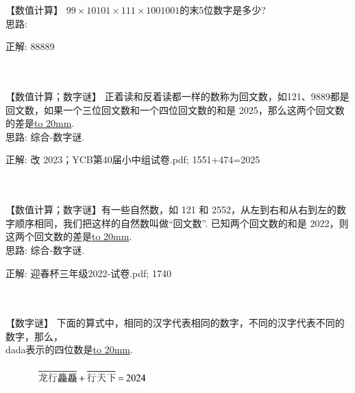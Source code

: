 \item {
    【数值计算】
    $99\times 10101\times 111\times 1001001$的末5位数字是多少?
    \ifshowSolution
        \fangsong{}
        \\
        思路:

        正解: 88889
    \else
        \\ \\ \\
    \fi
}

\item {
    【数值计算；数字谜】
    正着读和反着读都一样的数称为回文数，如121、9889都是回文数，如果一个三位回文数和一个四位回文数的和是 2025，那么这两个回文数的差是\underline{\hbox to 20mm{}}.
    \ifshowSolution
        \fangsong{}
        \\
        思路: 综合-数字谜.

        正解: 改  2023；YCB第40届小中组试卷.pdf; 1551+474=2025
    \else
        \\ \\ \\
    \fi
}

\item {
    【数值计算；数字谜】有一些自然数，如 121 和 2552，从左到右和从右到左的数字顺序相同，我们把这样的自然数叫做``回文数''. 已知两个回文数的和是 2022，则这两个回文数的差是\underline{\hbox to 20mm{}}.
    \ifshowSolution
        \fangsong{}
        \\
        思路: 综合-数字谜.

        正解:  迎春杯三年级2022-试卷.pdf; 1740
    \else
        \\ \\ \\
    \fi
}


\item {
    【数字谜】
    下面的算式中，相同的汉字代表相同的数字，不同的汉字代表不同的数字，那么，\\  dada表示的四位数是\underline{\hbox to 20mm{}}.
    \begin{figure}[H] 
        \centering
        \includegraphics[width=0.4\textwidth]{./pics/Chapter_7/2.png}
    \end{figure}
    \vspace{1cm}
}

